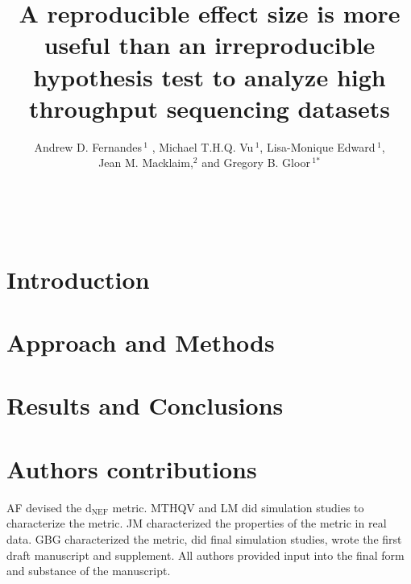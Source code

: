 \documentclass[11pt]{article}
\title{A reproducible effect size is more useful than an irreproducible hypothesis test to analyze high throughput sequencing datasets}
\author{Andrew D. Fernandes\,$^{\text{1}}$ , Michael T.H.Q. Vu\,$^{\text{1}}$, Lisa-Monique Edward\,$^{\text{1}}$, \\
Jean M. Macklaim,$^{\text{2}}$ and Gregory B. Gloor\,$^{\text{1}*}$}
\begin{document}
\maketitle

\\



\section*{Introduction}



\section*{Approach and Methods}





\section*{Results and Conclusions}






\section*{Authors contributions}
AF devised the $\mathrm{d_{NEF}}$ metric. MTHQV and LM did simulation studies to characterize the metric. JM characterized the properties of the metric in real data. GBG characterized the metric, did final simulation studies, wrote the first draft manuscript and supplement. All authors provided input into the final form and substance of the manuscript.

\end{document}
